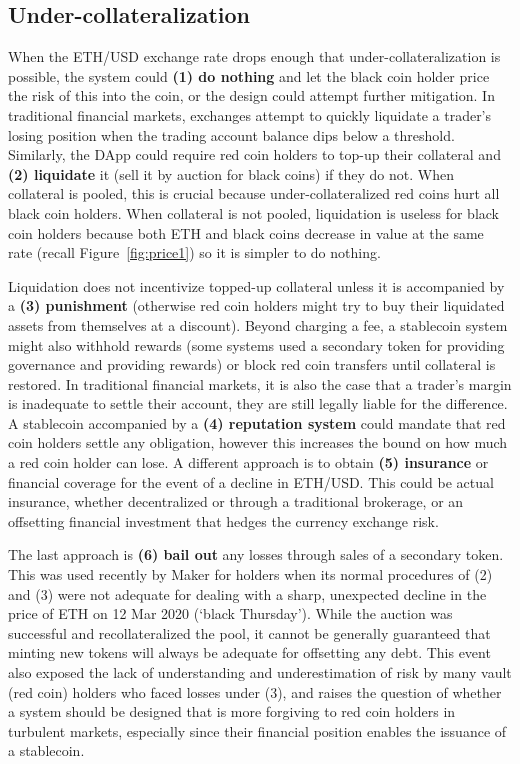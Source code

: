 

\subsection{Under-collateralization}

When the ETH/USD exchange rate drops enough that under-collateralization is possible, the system could \textbf{(1) do nothing} and let the black coin holder price the risk of this into the coin, or the design could attempt further mitigation. In traditional financial markets, exchanges attempt to quickly liquidate a trader's losing position when the trading account balance dips below a threshold. Similarly, the DApp could require red coin holders to top-up their collateral and \textbf{(2) liquidate} it (\eg sell it by auction for black coins) if they do not. When collateral is pooled, this is crucial because under-collateralized red coins hurt all black coin holders. When collateral is not pooled, liquidation is useless for black coin holders because both ETH and black coins decrease in value at the same rate (recall Figure~\ref{fig:price1}) so it is simpler to do nothing.

Liquidation does not incentivize topped-up collateral unless it is accompanied by a \textbf{(3) punishment} (otherwise red coin holders might try to buy their liquidated assets from themselves at a discount). Beyond charging a fee, a stablecoin system might also withhold rewards (some systems used a secondary token for providing governance and providing rewards) or block red coin transfers until collateral is restored. In traditional financial markets, it is also the case that a trader's margin is inadequate to settle their account, they are still legally liable for the difference. A stablecoin accompanied by a \textbf{(4) reputation system} could mandate that red coin holders settle any obligation, however this increases the bound on how much a red coin holder can lose. A different approach is to obtain \textbf{(5) insurance} or financial coverage for the event of a decline in ETH/USD. This could be actual insurance, whether decentralized or through a traditional brokerage, or an offsetting financial investment that hedges the currency exchange risk.

The last approach is \textbf{(6) bail out} any losses through sales of a secondary token. This was used recently by Maker for \dai holders when its normal procedures of (2) and (3) were not adequate for dealing with a sharp, unexpected decline in the price of ETH on 12 Mar 2020 (`black Thursday'). While the auction was successful and recollateralized the pool, it cannot be generally guaranteed that minting new tokens will always be adequate for offsetting any debt. This event also exposed the lack of understanding and underestimation of risk by many vault (\ie red coin) holders who faced losses under (3), and raises the question of whether a system should be designed that is more forgiving to red coin holders in turbulent markets, especially since their financial position enables the issuance of a stablecoin. 

